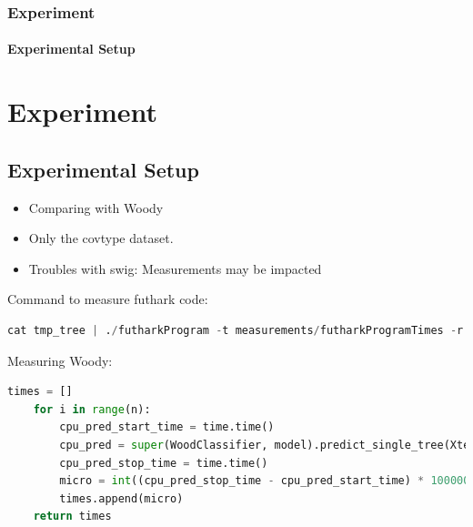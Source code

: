 \documentclass[12pt,t]{beamer}
\begin{document}
\begin{frame}[fragile]
  \frametitle{Experiment}
  \framesubtitle{Experimental Setup}
\section{Experiment}
\subsection{Experimental Setup}
\begin{itemize}
\item Comparing with Woody
\item Only the covtype dataset.
\item Troubles with swig: Measurements may be impacted
\end{itemize}

Command to measure futhark code:
\begin{lstlisting}[basicstyle=\tiny, language=Python, breaklines]
  cat tmp_tree | ./futharkProgram -t measurements/futharkProgramTimes -r 10 > measurements/futharkProgram.txt
\end{lstlisting}
Measuring Woody:
\begin{lstlisting}[basicstyle=\tiny, language=Python, breaklines]
    times = []
    for i in range(n):
        cpu_pred_start_time = time.time()
        cpu_pred = super(WoodClassifier, model).predict_single_tree(Xtest)
        cpu_pred_stop_time = time.time()
        micro = int((cpu_pred_stop_time - cpu_pred_start_time) * 1000000)
        times.append(micro)
    return times
  \end{lstlisting}
\end{frame}
\end{document}
